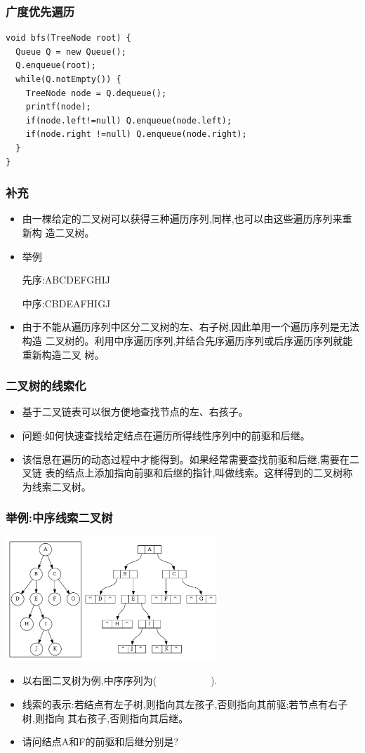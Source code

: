 \begin{frame}[fragile]
  \frametitle{广度优先遍历}
  \begin{verbatim}
void bfs(TreeNode root) {
  Queue Q = new Queue();
  Q.enqueue(root);
  while(Q.notEmpty()) {
    TreeNode node = Q.dequeue();
    printf(node);
    if(node.left!=null) Q.enqueue(node.left);
    if(node.right !=null) Q.enqueue(node.right);
  }
}
  \end{verbatim}
\end{frame}


\begin{frame}[fragile]
  \frametitle{补充}
  \begin{itemize}
  \item 由一棵给定的二叉树可以获得三种遍历序列,同样,也可以由这些遍历序列来重新构
    造二叉树。
  \item 举例
    
    先序:ABCDEFGHIJ
    
    中序:CBDEAFHIGJ
  \item 由于不能从遍历序列中区分二叉树的左、右子树,因此单用一个遍历序列是无法构造
    二叉树的。利用中序遍历序列,并结合先序遍历序列或后序遍历序列就能重新构造二叉
    树。
  \end{itemize}
\end{frame}

\begin{frame}[fragile]
  \frametitle{二叉树的线索化}
  \begin{itemize}
  \item 基于二叉链表可以很方便地查找节点的左、右孩子。
  \item 问题:如何快速查找给定结点在遍历所得线性序列中的前驱和后继。
  \item 该信息在遍历的动态过程中才能得到。如果经常需要查找前驱和后继,需要在二叉链
    表的结点上添加指向前驱和后继的指针,叫做{\color{red}线索}。这样得到的二叉树称
    为{\color{red}线索二叉树}。
  \end{itemize}
\end{frame}

\begin{frame}[fragile]
  \frametitle{举例:中序线索二叉树}
  \includegraphics[width=0.6\textwidth]{dot/tree-thread.pdf}
  \begin{itemize}
  \item 以右图二叉树为例,中序序列为(~~~~~~~~~~~).
  \item 线索的表示:若结点有左子树,则指向其左孩子,否则指向其前驱;若节点有右子树,则指向
    其右孩子,否则指向其后继。
  \item 请问结点A和F的前驱和后继分别是?
  \end{itemize}
\end{frame}

